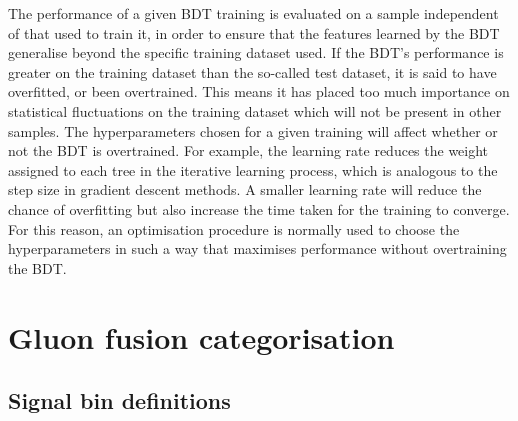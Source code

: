 The performance of a given BDT training is evaluated on a sample independent 
of that used to train it, in order to ensure that 
the features learned by the BDT generalise beyond the specific training dataset used.
If the BDT's performance is greater on the training dataset than the so-called test dataset, 
it is said to have overfitted, or been overtrained.
This means it has placed too much importance on statistical fluctuations on the training dataset
which will not be present in other samples.
The hyperparameters chosen for a given training will affect whether or not the BDT is overtrained.
For example, the learning rate reduces the weight assigned to each tree in the iterative learning
process, which is analogous to the step size in gradient descent methods.
A smaller learning rate will reduce the chance of overfitting 
but also increase the time taken for the training to converge.
For this reason, an optimisation procedure is normally used to choose the hyperparameters
in such a way that maximises performance without overtraining the BDT.

\section{Gluon fusion categorisation}
\subsection{Signal bin definitions}

